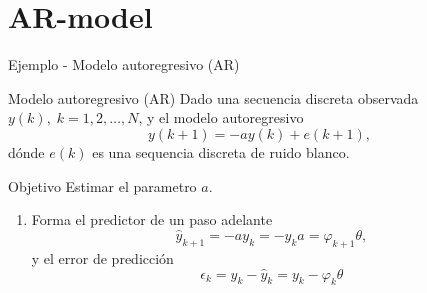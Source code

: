 \documentclass[presentation,aspectratio=169]{beamer}
\begin{document}
\section{AR-model}
\label{sec:org84048f3}

\begin{frame}[label={sec:orgf90668c}]{Ejemplo - Modelo autoregresivo (AR)}
\end{frame}
\begin{frame}[label={sec:orgec1f1ba}]{Modelo autoregresivo (AR)}
Dado una secuencia discreta observada \(y(k), \; k=1,2,\ldots,N\), y el modelo autoregresivo
\[ y(k+1) = -ay(k) + e(k+1),\]
dónde \(e(k)\) es una sequencia discreta de ruido blanco.

\alert{Objetivo} Estimar el parametro \(a\).

\begin{enumerate}
\item Forma el predictor de un paso adelante \[\hat{y}_{k+1} = -ay_k=-y_ka = \varphi_{k+1} \theta,\] y el error de predicción \[\epsilon_k = y_k - \hat{y}_k = y_k - \varphi_k \theta\]
\end{enumerate}
\end{frame}
\end{document}
